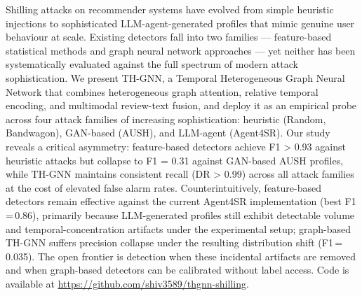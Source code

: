 ﻿%

Shilling attacks on recommender systems have evolved from simple heuristic injections to sophisticated LLM-agent-generated profiles that mimic genuine user behaviour at scale. Existing detectors fall into two families — feature-based statistical methods and graph neural network approaches — yet neither has been systematically evaluated against the full spectrum of modern attack sophistication. We present TH-GNN, a Temporal Heterogeneous Graph Neural Network that combines heterogeneous graph attention, relative temporal encoding, and multimodal review-text fusion, and deploy it as an empirical probe across four attack families of increasing sophistication: heuristic (Random, Bandwagon), GAN-based (AUSH), and LLM-agent (Agent4SR). Our study reveals a critical asymmetry: feature-based detectors achieve F1 > 0.93 against heuristic attacks but collapse to F1 = 0.31 against GAN-based AUSH profiles, while TH-GNN maintains consistent recall (DR > 0.99) across all attack families at the cost of elevated false alarm rates. Counterintuitively, feature-based detectors remain effective against the current Agent4SR implementation (best F1\,=\,0.86), primarily because LLM-generated profiles still exhibit detectable volume and temporal-concentration artifacts under the experimental setup; graph-based TH-GNN suffers precision collapse under the resulting distribution shift (F1\,=\,0.035). The open frontier is detection when these incidental artifacts are removed and when graph-based detectors can be calibrated without label access.
Code is available at \url{https://github.com/shiv3589/thgnn-shilling}.
